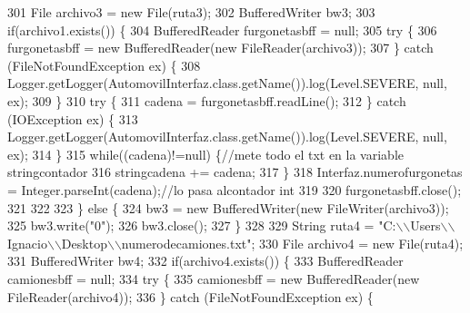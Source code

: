 \begin{DoxyCode}
301 \textcolor{comment}{        File archivo3 = new File(ruta3);}
302 \textcolor{comment}{        BufferedWriter bw3;}
303 \textcolor{comment}{        if(archivo1.exists()) \{}
304 \textcolor{comment}{            BufferedReader furgonetasbff = null;}
305 \textcolor{comment}{                    try \{}
306 \textcolor{comment}{                        furgonetasbff = new BufferedReader(new FileReader(archivo3));}
307 \textcolor{comment}{                    \} catch (FileNotFoundException ex) \{}
308 \textcolor{comment}{                        Logger.getLogger(AutomovilInterfaz.class.getName()).log(Level.SEVERE, null, ex);}
309 \textcolor{comment}{                    \}}
310 \textcolor{comment}{                    try \{}
311 \textcolor{comment}{                        cadena = furgonetasbff.readLine();}
312 \textcolor{comment}{                    \} catch (IOException ex) \{}
313 \textcolor{comment}{                        Logger.getLogger(AutomovilInterfaz.class.getName()).log(Level.SEVERE, null, ex);}
314 \textcolor{comment}{                    \}}
315 \textcolor{comment}{                while((cadena)!=null) \{//mete todo el txt en la variable stringcontador}
316 \textcolor{comment}{                        stringcadena += cadena;}
317 \textcolor{comment}{                    \}}
318 \textcolor{comment}{                Interfaz.numerofurgonetas = Integer.parseInt(cadena);//lo pasa alcontador int }
319 \textcolor{comment}{                }
320 \textcolor{comment}{                furgonetasbff.close();}
321 \textcolor{comment}{                }
322 \textcolor{comment}{            }
323 \textcolor{comment}{        \} else \{}
324 \textcolor{comment}{            bw3 = new BufferedWriter(new FileWriter(archivo3));}
325 \textcolor{comment}{            bw3.write("0");}
326 \textcolor{comment}{            bw3.close();}
327 \textcolor{comment}{        \}}
328 \textcolor{comment}{        }
329 \textcolor{comment}{        String ruta4 = "C:\(\backslash\)\(\backslash\)Users\(\backslash\)\(\backslash\)Ignacio\(\backslash\)\(\backslash\)Desktop\(\backslash\)\(\backslash\)numerodecamiones.txt";}
330 \textcolor{comment}{        File archivo4 = new File(ruta4);}
331 \textcolor{comment}{        BufferedWriter bw4;}
332 \textcolor{comment}{        if(archivo4.exists()) \{}
333 \textcolor{comment}{            BufferedReader camionesbff = null;}
334 \textcolor{comment}{                    try \{}
335 \textcolor{comment}{                        camionesbff = new BufferedReader(new FileReader(archivo4));}
336 \textcolor{comment}{                    \} catch (FileNotFoundException ex) \{}

\end{DoxyCode}
